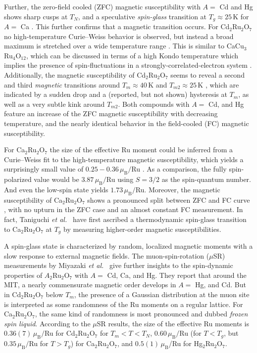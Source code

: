\documentclass[10pt]{iopart}
\newcommand{\mub}{\,\mu_\text{B}}
\begin{document}
Further, the zero-field cooled (ZFC) magnetic susceptibility with $A=$ Cd \cite{miyazaki2010magnetic,jiao2018effect} and Hg \cite{klein2007hg} shows sharp cusps at $T_N$, and a speculative \emph{spin-glass} transition at $T_g\approx25\,$K for $A=$ Ca \cite{munenaka2006novel,taniguchi2009spin}. This further confirms that a magnetic transition occurs.  
For Cd$_2$Ru$_2$O$_7$ no high-temperature Curie--Weiss behavior is observed, but instead a broad maximum is stretched over a wide temperature range \cite{wang1998synthesis,jiao2018effect}. This is similar to CaCu$_3$Ru$_4$O$_{12}$, which can be discussed in terms of a high Kondo temperature which implies the presence of spin-fluctuations in a strongly-correlated-electron system \cite{krimmel2008non}. Additionally, the magnetic susceptibility of Cd$_2$Ru$_2$O$_7$ seems to reveal a second and third \emph{magnetic} transitions around $T_{m}\approx40\,$K and $T_{m2}\approx25\,$K \cite{jiao2018effect}, which are indicated by a sudden drop and a (reported, but not shown) hysteresis at $T_m$, as well as a very subtle kink around $T_{m2}$. Both compounds with $A=$ Cd, and Hg feature an increase of the ZFC magnetic susceptibility with decreasing temperature, and the nearly identical behavior in the field-cooled (FC) magnetic susceptibility.

For Ca$_2$Ru$_2$O$_7$ the size of the effective Ru moment could be inferred from a Curie--Weiss fit to the high-temperature magnetic susceptibility, which yields a surprisingly small value of $0.25-0.36\mub/$Ru \cite{munenaka2006novel,taniguchi2009spin}. As a comparison, the fully spin-polarized value would be $3.87\mub/$Ru using $S=3/2$ as the spin-quantum number. 
And even the low-spin state yields $1.73\mub/$Ru.
Moreover, the magnetic susceptibility of Ca$_2$Ru$_2$O$_7$ shows a pronounced split between ZFC and FC curve \cite{munenaka2006novel}, with no upturn in the ZFC case and an almost constant FC measurement. 
In fact, Taniguchi \emph{et al.\ }\cite{taniguchi2009spin} have first ascribed a thermodynamic spin-glass transition to Ca$_2$Ru$_2$O$_7$ at $T_g$ by measuring higher-order magnetic susceptibilities.

A spin-glass state is characterized by random, localized magnetic moments with a slow response to external magnetic fields. The muon-spin-rotation ($\mu$SR) measurements by Miyazaki \emph{et al.\ }\cite{miyazaki2010magnetic} give further insights to the spin-dynamic properties of $A_2$Ru$_2$O$_7$ with $A=$ Cd, Ca, and Hg. They report that around the MIT, a nearly commensurate magnetic order develops in $A=$ Hg, and Cd. But in Cd$_2$Ru$_2$O$_7$ below $T_m$, the presence of a Gaussian distribution at the muon site is interpreted as some randomness of the Ru moments on a regular lattice. For Ca$_2$Ru$_2$O$_7$, the same kind of randomness is most pronounced and dubbed \emph{frozen spin liquid}.  
According to the $\mu$SR results, the size of the effective Ru moments is $0.36(7)\mub/$Ru for Cd$_2$Ru$_2$O$_7$ for $T_m<T<T_N$, $0.60\mub/$Ru (for $T < T_g$, but $0.35\mub/$Ru for $T > T_g$) for Ca$_2$Ru$_2$O$_7$, and $0.5(1)\mub$/Ru for Hg$_2$Ru$_2$O$_7$.
\end{document}
